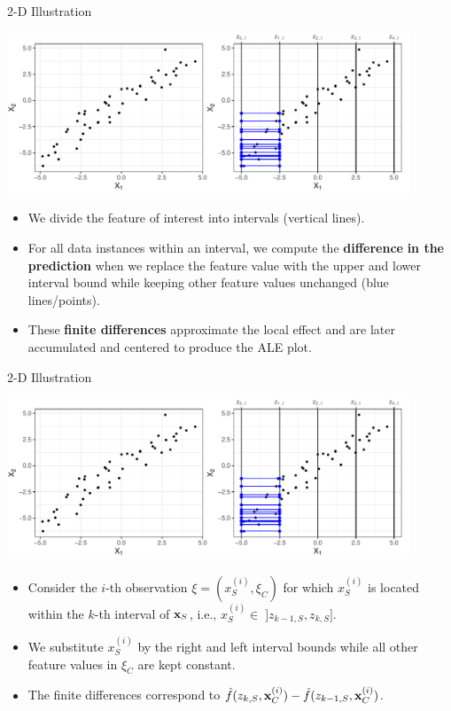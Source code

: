 \documentclass[11pt,compress,t,notes=noshow, xcolor=table]{beamer}
\begin{document}
\begin{vbframe}{2-D Illustration}

\centerline{\includegraphics[width=0.9\textwidth]{figure_man/ale_interval}}

\begin{itemize}
\item We divide the feature of interest into intervals (vertical lines).
\item For all data instances within an interval, we compute the \textbf{difference} \textbf{in the prediction} when we replace the feature value with the upper and lower interval bound while keeping other feature values unchanged (blue lines/points).
\item These \textbf{finite differences} approximate the local effect and are later accumulated and centered to produce the ALE plot.
\end{itemize}

\end{vbframe}


\begin{vbframe}{2-D Illustration}
\centerline{\includegraphics[width=0.9\textwidth]{figure_man/ale_interval}}

 \begin{itemize}
  \item Consider the $i$-th observation $\xi = (x_S^{(i)}, \xi_C)$ for which $x_S^{(i)}$ is located within the $k$-th interval of $\xv_S$, i.e., $x_S^{(i)} \in \; ]z_{k-1, S}, z_{k, S}]$.
  \item We substitute $x_S^{(i)}$ by the right and left interval bounds while all other feature values in $\xi_C$ are kept constant.
  \item The finite differences correspond to $\fh(z_{k, S}, \xi_C) - \fh(z_{k-1, S}, \xi_C)$. %
\end{itemize}

\end{vbframe}
\end{document}

